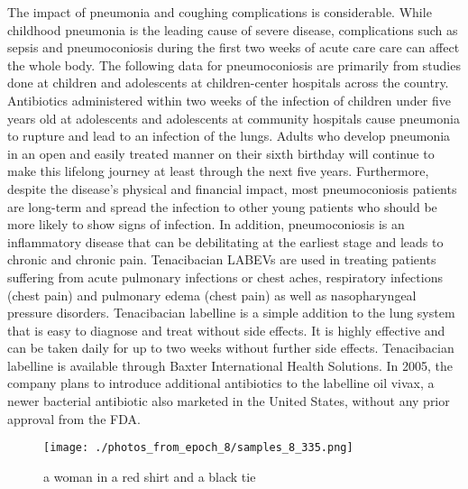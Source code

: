 \documentclass{article}%
\begin{document}
The impact of pneumonia and coughing complications is considerable. While childhood pneumonia is the leading cause of severe disease, complications such as sepsis and pneumoconiosis during the first two weeks of acute care care can affect the whole body. The following data for pneumoconiosis are primarily from studies done at children and adolescents at children{-}center hospitals across the country. Antibiotics administered within two weeks of the infection of children under five years old at adolescents and adolescents at community hospitals cause pneumonia to rupture and lead to an infection of the lungs. Adults who develop pneumonia in an open and easily treated manner on their sixth birthday will continue to make this lifelong journey at least through the next five years. Furthermore, despite the disease’s physical and financial impact, most pneumoconiosis patients are long{-}term and spread the infection to other young patients who should be more likely to show signs of infection. In addition, pneumoconiosis is an inflammatory disease that can be debilitating at the earliest stage and leads to chronic and chronic pain.\newline%
Tenacibacian LABEVs are used in treating patients suffering from acute pulmonary infections or chest aches, respiratory infections (chest pain) and pulmonary edema (chest pain) as well as nasopharyngeal pressure disorders. Tenacibacian labelline is a simple addition to the lung system that is easy to diagnose and treat without side effects. It is highly effective and can be taken daily for up to two weeks without further side effects.\newline%
Tenacibacian labelline is available through Baxter International Health Solutions. In 2005, the company plans to introduce additional antibiotics to the labelline oil vivax, a newer bacterial antibiotic also marketed in the United States, without any prior approval from the FDA.\newline%

%


\begin{figure}[h!]%
\centering%
\texttt{[image: ./photos\_from\_epoch\_8/samples\_8\_335.png]}%
\caption{a woman in a red shirt and a black tie}%
\end{figure}

%
\end{document}
